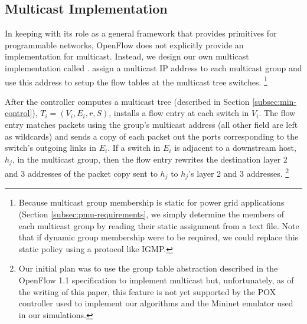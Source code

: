 \subsection{Multicast Implementation} 
\label{subsec:basic}

In keeping with its role as a general framework that provides primitives for programmable networks, OpenFlow does not explicitly provide an implementation for multicast. 
Instead, we design our own multicast implementation called \bases.  \base assign a multicast IP address to each multicast group and use
this address to setup the flow tables at the multicast tree switches.  
  \footnote{Because multicast group membership is static for power grid applications (Section \ref{subsec:pmu-requirements}, 
  we simply determine the members of each multicast group by reading their static assignment from a text file.  Note that if dynamic group membership were to be required, we could 
  replace this static policy using a protocol like IGMP. }

After the controller computes a multicast tree (described in Section \ref{subsec:min-control}), $T_i = (V_i,E_i,r,S)$, \base installs a flow entry at each switch in $V_i$. The flow entry
matches packets using the group's multicast address (all other field are left as wildcards) and sends a copy of each packet out the ports corresponding to the switch's 
outgoing links in $E_i$. If a switch in $E_i$ is adjacent to a downstream host, $h_j$, in the multicast group, then the flow entry rewrites the destination layer 2 and 3 addresses of the 
packet copy sent to $h_j$ to $h_j$'s layer 2 and 3 addresses.
\footnote{Our initial plan was to use the group table abstraction described in the OpenFlow 1.1 specification \cite{OpenFlowSpec1.1} to implement multicast but, unfortunately,
as of the writing of this paper, this feature is not yet supported by the POX controller \cite{Pox} used to implement our algorithms and 
the Mininet emulator \cite{Lantz10} used in our simulations.}







